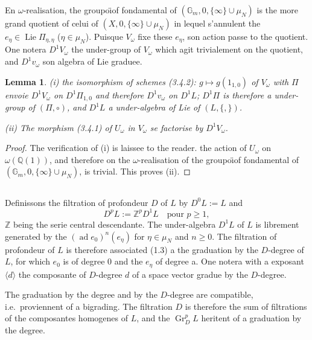 \documentclass[11pt,a4paper]{article}
\theoremstyle{plain}
\newtheorem{lemma}[theorem]{Lemma}
\theoremstyle{definition}
\DeclareMathOperator{\Lie}{Lie}
\DeclareMathOperator{\ad}{ad}
\newcommand{\Gm}{\mathbb{G}_m}
\newcommand{\Q}{\mathbb{Q}}
\newcommand{\Z}{\mathbb{Z}}
\newcommand{\Gr}{\operatorname{Gr}}
\begin{document}
En $\omega$-realisation, the groupo\"{\i}of fondamental of $(\Gm, 0, \{\infty\} \cup \mu_N)$ is the more grand quotient of celui of $(X, 0, \{\infty\} \cup \mu_N)$ in lequel s'annulent the $e_\eta \in \Lie \Pi_{\eta,\eta}$ ($\eta \in \mu_N$). Puisque $V_\omega$ fixe these $e_\eta$, son action passe to the quotient. One notera $D^1V_\omega$ the under-group of $V_\omega$ which agit trivialement on the quotient, and $D^1v_\omega$ son algebra of Lie graduee.

\begin{lemma}\label{lem:3.6}
\emph{(i)} the isomorphism of schemes (3.4.2): $g \mapsto g(1_{1,0})$ of $V_\omega$ with $\Pi$ envoie $D^1V_\omega$ on $D^1\Pi_{1,0}$ and therefore $D^1v_\omega$ on $D^1L$; $D^1\Pi$ is therefore a under-group of $(\Pi, \circ)$, and $D^1L$ a under-algebra of Lie of $(L, \{,\})$.

\emph{(ii)} The morphism (3.4.1) of $U_\omega$ in $V_\omega$ se factorise by $D^1V_\omega$.
\end{lemma}

\begin{proof}
The verification of (i) is laissee to the reader. the action of $U_\omega$ on $\omega(\Q(1))$, and therefore on the $\omega$-realisation of the groupo\"{\i}of fondamental of $(\Gm, 0, \{\infty\} \cup \mu_N)$, is trivial. This proves (ii).
\end{proof}

\subsection{}
Definissons the filtration of profondeur $D$ of $L$ by $D^0L := L$ and
\begin{equation}\label{eq:3.7.1}
D^pL := \Z^p D^1L \quad \text{pour }p \geq 1,
\end{equation}
$\Z$ being the serie central descendante. The under-algebra $D^1L$ of $L$ is librement generated by the $(\ad e_0)^n(e_\eta)$ for $\eta \in \mu_N$ and $n \geq 0$. The filtration of profondeur of $L$ is therefore associated (1.3) a the graduation by the $D$-degree of $L$, for which $e_0$ is of degree $0$ and the $e_\eta$ of degree a. One notera with a exposant $\langle d \rangle$ the composante of $D$-degree $d$ of a space vector gradue by the $D$-degree.

The graduation by the degree and by the $D$-degree are compatible, i.e.~proviennent of a bigrading. The filtration $D$ is therefore the sum of filtrations of the composantes homogenes of $L$, and the $\Gr_D^p L$ heritent of a graduation by the degree.
\end{document}
